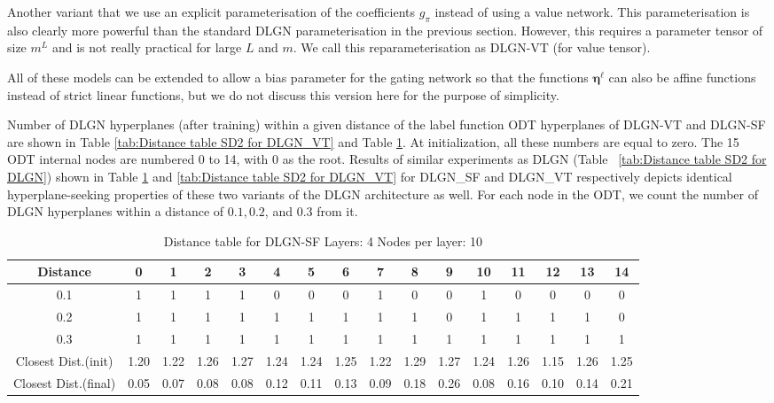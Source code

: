 \documentclass{article} %
\renewcommand{\>}{{\rightarrow}}
\renewcommand{\=}{\stackrel{\triangle}{=}}
\newcommand{\0}{{\mathbf 0}}
\newcommand{\boldeta}{{\boldsymbol \eta}}
\begin{document}
Another variant that we use an explicit parameterisation of the coefficients $g_\pi$ instead of using a value network. This parameterisation is also clearly more powerful than the standard DLGN parameterisation in the previous section. However, this requires a parameter tensor of size $m^L$ and is not really practical for large $L$ and $m$. We call this reparameterisation as DLGN-VT (for value tensor). 

All of these models can be extended to allow a bias parameter for the gating network so that the functions $\boldeta^\ell$ can also be affine functions instead of strict linear functions, but we do not discuss this version here for the purpose of simplicity.

Number of DLGN hyperplanes (after training) within a given distance of the label function ODT hyperplanes of DLGN-VT and DLGN-SF are shown in Table \ref{tab:Distance table SD2 for DLGN_VT} and Table \ref{tab:Distance table SD2 for DLGN_SF}. At initialization, all these numbers are equal to zero. The 15 ODT internal nodes are numbered 0 to 14, with 0 as the root. Results of similar experiments as DLGN (Table ~\ref{tab:Distance table SD2 for DLGN}) shown in Table \ref{tab:Distance table SD2 for DLGN_SF} and \ref{tab:Distance table SD2 for DLGN_VT} for DLGN\_SF and DLGN\_VT respectively depicts identical hyperplane-seeking properties of these two variants of the DLGN architecture as well. For each node in the ODT, we count the number of DLGN hyperplanes within a distance of $0.1, 0.2$, and $0.3$ from it.

\begin{table}[t]
\caption{Distance table for DLGN-SF Layers: 4 Nodes per layer: 10}
\label{tab:Distance table SD2 for DLGN_SF}
\begin{center}
\begin{adjustbox}{width=0.99 \textwidth}
\begin{tabular}{|c||c|c|c|c|c|c|c|c|c|c|c|c|c|c|c|} 
\hline
Distance & 0 & 1 & 2 & 3 & 4 & 5 & 6 & 7 & 8 & 9 & 10 & 11 & 12 & 13 & 14 \\ \hline
 0.1        &1 &1 &1 &1 &0 &0 &0 &1 &0 &0 &1 &0 &0 &0 &0\\
 0.2        &1 &1 &1 &1 &1 &1 &1 &1 &1 &0 &1 &1 &1 &1 &0\\
 0.3       &1 &1 &1 &1 &1 &1 &1 &1 &1 &1 &1 &1 &1 &1 &1\\ 
 \hline
 \hline
 Closest Dist.(init) &1.20 &1.22 &1.26 &1.27 &1.24 &1.24 &1.25 &1.22 &1.29 &1.27 &1.24 &1.26 &1.15 &1.26 &1.25\\
 Closest Dist.(final) &0.05 &0.07 &0.08 &0.08 &0.12 &0.11 &0.13 &0.09 &0.18 &0.26 &0.08 &0.16 &0.10 &0.14 &0.21\\
 \hline
\end{tabular}
\end{adjustbox}
\end{center}
\end{table}
\end{document}
